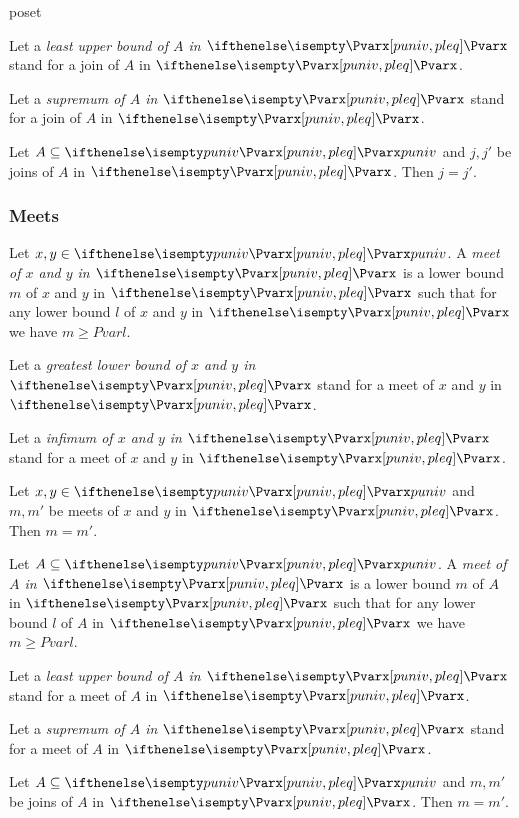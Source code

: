 \documentclass{stex}
\begin{document}
\begin{smodule}{poset}
\begin{forthel}
    Let a \emph{least upper bound of $A$ in $\Pvar{}$} stand for a join of $A$ in $\Pvar{}$.

    Let a \emph{supremum of $A$ in $\Pvar{}$} stand for a join of $A$ in $\Pvar{}$.

    \begin{proposition}
      Let $A \subseteq \univ{Pvar}$ and $j, j'$ be joins of $A$ in $\Pvar{}$.
      Then $j = j'$.
    \end{proposition}
  \end{forthel}

  \subsubsection{Meets}

  \begin{forthel}
    \begin{definition}
      Let $x, y \in \univ{Pvar}$.
      A \emph{meet of $x$ and $y$ in $\Pvar{}$} is a lower bound $m$ of $x$ and $y$ in $\Pvar{}$ such that for any lower bound $l$ of $x$ and $y$ in $\Pvar{}$ we have $m \geq{Pvar} l$.
    \end{definition}

    Let a \emph{greatest lower bound of $x$ and $y$ in $\Pvar{}$} stand for a meet of $x$ and $y$ in $\Pvar{}$.

    Let a \emph{infimum of $x$ and $y$ in $\Pvar{}$} stand for a meet of $x$ and $y$ in $\Pvar{}$.

    \begin{proposition}
      Let $x, y \in \univ{Pvar}$ and $m, m'$ be meets of $x$ and $y$ in $\Pvar{}$.
      Then $m = m'$.
    \end{proposition}
    
    \begin{definition}
      Let $A \subseteq \univ{Pvar}$.
      A \emph{meet of $A$ in $\Pvar{}$} is a lower bound $m$ of $A$ in $\Pvar{}$ such that for any lower bound $l$ of $A$ in $\Pvar{}$ we have $m \geq{Pvar} l$.
    \end{definition}

    Let a \emph{least upper bound of $A$ in $\Pvar{}$} stand for a meet of $A$ in $\Pvar{}$.

    Let a \emph{supremum of $A$ in $\Pvar{}$} stand for a meet of $A$ in $\Pvar{}$.

    \begin{proposition}
      Let $A \subseteq \univ{Pvar}$ and $m, m'$ be joins of $A$ in $\Pvar{}$.
      Then $m = m'$.
    \end{proposition}
  \end{forthel}


\end{smodule}
\end{document}
